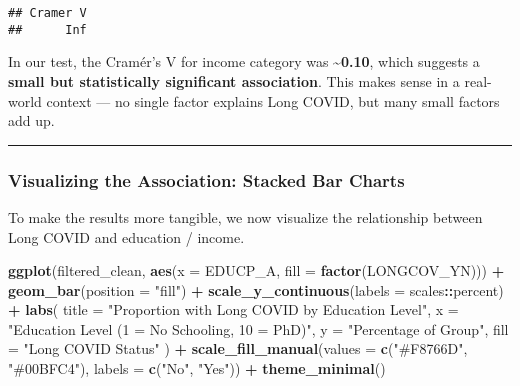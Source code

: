 \documentclass[
]{article}
\newenvironment{Shaded}{\begin{snugshade}}{\end{snugshade}}
\newcommand{\AttributeTok}[1]{\textcolor[rgb]{0.13,0.29,0.53}{#1}}
\newcommand{\FunctionTok}[1]{\textcolor[rgb]{0.13,0.29,0.53}{\textbf{#1}}}
\newcommand{\NormalTok}[1]{#1}
\newcommand{\SpecialCharTok}[1]{\textcolor[rgb]{0.81,0.36,0.00}{\textbf{#1}}}
\newcommand{\StringTok}[1]{\textcolor[rgb]{0.31,0.60,0.02}{#1}}
\begin{document}
\begin{verbatim}
## Cramer V 
##      Inf
\end{verbatim}

In our test, the Cramér's V for income category was
\textbf{\textasciitilde0.10}, which suggests a \textbf{small but
statistically significant association}. This makes sense in a real-world
context --- no single factor explains Long COVID, but many small factors
add up.

\begin{center}\rule{0.5\linewidth}{0.5pt}\end{center}

\subsubsection{Visualizing the Association: Stacked Bar
Charts}\label{visualizing-the-association-stacked-bar-charts}

To make the results more tangible, we now visualize the relationship
between Long COVID and education / income.

\begin{Shaded}
\begin{Highlighting}[]
\FunctionTok{ggplot}\NormalTok{(filtered\_clean, }\FunctionTok{aes}\NormalTok{(}\AttributeTok{x =}\NormalTok{ EDUCP\_A, }\AttributeTok{fill =} \FunctionTok{factor}\NormalTok{(LONGCOV\_YN))) }\SpecialCharTok{+}
  \FunctionTok{geom\_bar}\NormalTok{(}\AttributeTok{position =} \StringTok{"fill"}\NormalTok{) }\SpecialCharTok{+}
  \FunctionTok{scale\_y\_continuous}\NormalTok{(}\AttributeTok{labels =}\NormalTok{ scales}\SpecialCharTok{::}\NormalTok{percent) }\SpecialCharTok{+}
  \FunctionTok{labs}\NormalTok{(}
    \AttributeTok{title =} \StringTok{"Proportion with Long COVID by Education Level"}\NormalTok{,}
    \AttributeTok{x =} \StringTok{"Education Level (1 = No Schooling, 10 = PhD)"}\NormalTok{,}
    \AttributeTok{y =} \StringTok{"Percentage of Group"}\NormalTok{,}
    \AttributeTok{fill =} \StringTok{"Long COVID Status"}
\NormalTok{  ) }\SpecialCharTok{+}
  \FunctionTok{scale\_fill\_manual}\NormalTok{(}\AttributeTok{values =} \FunctionTok{c}\NormalTok{(}\StringTok{"\#F8766D"}\NormalTok{, }\StringTok{"\#00BFC4"}\NormalTok{), }\AttributeTok{labels =} \FunctionTok{c}\NormalTok{(}\StringTok{"No"}\NormalTok{, }\StringTok{"Yes"}\NormalTok{)) }\SpecialCharTok{+}
  \FunctionTok{theme\_minimal}\NormalTok{()}
\end{Highlighting}
\end{Shaded}
\end{document}
